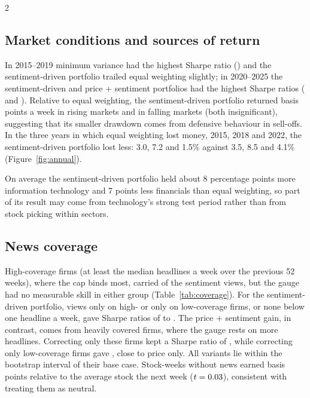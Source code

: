 \begin{multicols}{2}

\subsection{Market conditions and sources of return}\label{sec:conditions}
In 2015--2019 minimum variance had the highest Sharpe ratio (\RobTwoZeroOneFiveTwoZeroOneNineMinVarSharpe) and the sentiment-driven portfolio trailed equal weighting slightly; in 2020--2025 the sentiment-driven and price + sentiment portfolios had the highest Sharpe ratios (\RobTwoZeroTwoZeroTwoZeroTwoFiveSentimentSharpe{} and \RobTwoZeroTwoZeroTwoZeroTwoFiveCombinedSharpe). Relative to equal weighting, the sentiment-driven portfolio returned \UpSentimentEW{} basis points a week in rising markets and \DownSentimentEW{} in falling markets (both insignificant), suggesting that its smaller drawdown comes from defensive behaviour in sell-offs. In the three years in which equal weighting lost money, 2015, 2018 and 2022, the sentiment-driven portfolio lost less: 3.0, 7.2 and 1.5\% against 3.5, 8.5 and 4.1\% (Figure~\ref{fig:annual}).

On average the sentiment-driven portfolio held about 8 percentage points more information technology and 7 points less financials than equal weighting, so part of its result may come from technology's strong test period rather than from stock picking within sectors.
\subsection{News coverage}\label{sec:coverage}
High-coverage firms (at least the median \CovMedian{} headlines a week over the previous 52 weeks), where the cap binds most, carried \CovViewShareHigh{} of the sentiment views, but the gauge had no measurable skill in either group (Table~\ref{tab:coverage}). For the sentiment-driven portfolio, views only on high- or only on low-coverage firms, or none below one headline a week, gave Sharpe ratios of \CovMinSharpe{} to \CovLowSharpe{}. The price + sentiment gain, in contrast, comes from heavily covered firms, where the gauge rests on more headlines. Correcting only these firms kept a Sharpe ratio of \CovCombHighSharpe{}, while correcting only low-coverage firms gave \CovCombLowSharpe{}, close to price only. All variants lie within the bootstrap interval of their base case. Stock-weeks without news earned \NoNewsRet{} basis points relative to the average stock the next week ($t=0.03$), consistent with treating them as neutral.
\end{multicols}
